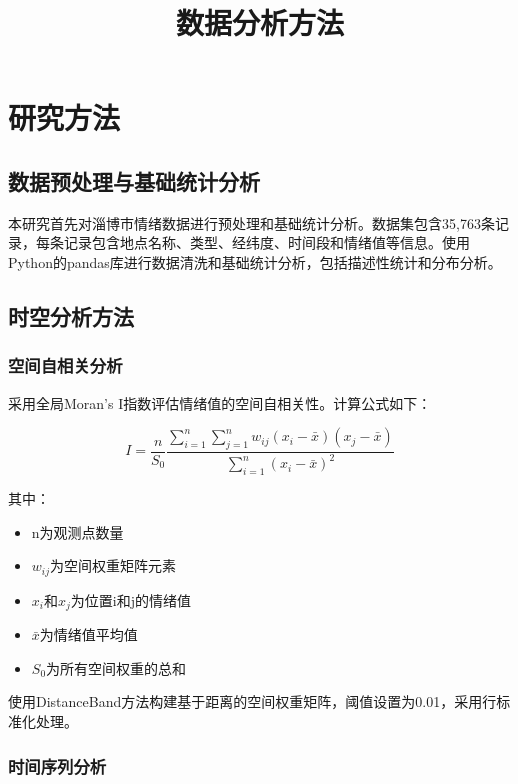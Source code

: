 \documentclass[12pt,a4paper]{article}
\title{数据分析方法}
\author{}
\date{}
\begin{document}
\maketitle

\section{研究方法}

\subsection{数据预处理与基础统计分析}

本研究首先对淄博市情绪数据进行预处理和基础统计分析。数据集包含35,763条记录，每条记录包含地点名称、类型、经纬度、时间段和情绪值等信息。使用Python的pandas库进行数据清洗和基础统计分析，包括描述性统计和分布分析。

\subsection{时空分析方法}

\subsubsection{空间自相关分析}

采用全局Moran's I指数评估情绪值的空间自相关性。计算公式如下：

\begin{equation}
I = \frac{n}{S_0} \frac{\sum_{i=1}^n \sum_{j=1}^n w_{ij}(x_i - \bar{x})(x_j - \bar{x})}{\sum_{i=1}^n (x_i - \bar{x})^2}
\end{equation}

其中：
\begin{itemize}
\item n为观测点数量
\item $w_{ij}$为空间权重矩阵元素
\item $x_i$和$x_j$为位置i和j的情绪值
\item $\bar{x}$为情绪值平均值
\item $S_0$为所有空间权重的总和
\end{itemize}

使用DistanceBand方法构建基于距离的空间权重矩阵，阈值设置为0.01，采用行标准化处理。

\subsubsection{时间序列分析}
\end{document}

